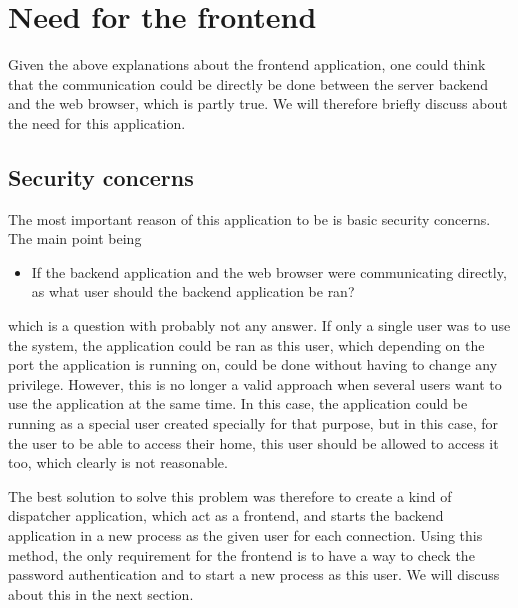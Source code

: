 \section{Need for the frontend}
Given the above explanations about the frontend application, one could 
think that the communication could be directly be done between the 
server backend and the web browser, which is partly true. We will therefore
briefly discuss about the need for this application.
%
\subsection{Security concerns}
The most important reason of this application to be is basic security concerns. 
The main point being
\begin{itemize}
\item If the backend application and the web browser were communicating directly, 
  as what user should the backend application be ran?   
\end{itemize}
which is a question with probably not any answer. If only a single user was to 
use the system, the application could be ran as this user, which depending on the 
port the application is running on, could be done without having to change any privilege.
However, this is no longer a valid approach when several users want to use the application 
at the same time. In this case, the application could be running as a special user 
created specially for that purpose, but in this case, for the user to be able to access 
their home, this user should be allowed to access it too, which clearly is not reasonable.

The best solution to solve this problem was therefore to create a kind of dispatcher application, 
which act as a frontend, and starts the backend application in a new process as the given user 
for each connection. Using this method, the only requirement for the frontend is to have a
way to check the password authentication and to start a new process as this user. We will 
discuss about this in the next section.

